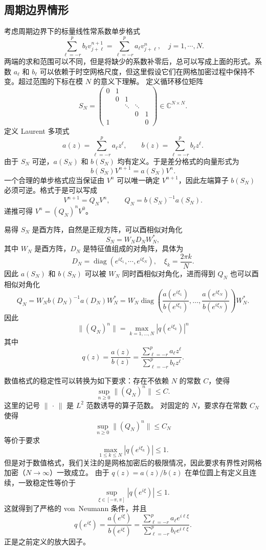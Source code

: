 \subsection*{周期边界情形}

考虑周期边界下的标量线性常系数单步格式
\[
    \sum_{\ell=-r}^{p} b_\ell v_{j+\ell}^{n+1}
    = \sum_{\ell=-r}^{p} a_\ell v_{j+\ell}^n,
    \quad j=1,\cdots,N.
\]
两端的求和范围可以不同，但是将缺少的系数补零后，总可以写成上面的形式。系数 $a_\ell$ 和 $b_\ell$ 可以依赖于时空网格尺度，但这里假设它们在网格加密过程中保持不变。超过范围的下标在模 $N$ 的意义下理解。
定义循环移位矩阵
\[
    S_N =
    \begin{pmatrix}
        0 & 1 &        &        &   \\
          & 0 & 1      &        &   \\
          &   & \ddots & \ddots &   \\
          &   &        & 0      & 1 \\
        1 &   &        &        & 0
    \end{pmatrix} \in \mathbb{C}^{N\times N}.
\]
定义 Laurent 多项式
\[
    a(z)=\sum_{\ell=-r}^{p}a_\ell z^\ell,
    \qquad
    b(z)=\sum_{\ell=-r}^{p}b_\ell z^\ell.
\]
由于 $S_N$ 可逆，$a(S_N)$ 和 $b(S_N)$ 均有定义。于是差分格式的向量形式为
\[
    b(S_N)V^{n+1}=a(S_N)V^n.
\]
一个合理的单步格式应当保证由 $V^n$ 可以唯一确定 $V^{n+1}$，因此左端算子 $b(S_N)$ 必须可逆。格式于是可以写成
\[
    V^{n+1}=Q_NV^n,
    \qquad
    Q_N=b(S_N)^{-1}a(S_N).
\]
递推可得 $V^n=(Q_N)^nV^0$。

易得 $S_N$ 是酉方阵，自然是正规方阵，可以酉相似对角化
\[
    S_N = W_N D_N W_N^*,
\]
其中 $W_N$ 是酉方阵，$D_N$ 是特征值组成的对角阵，具体为
\[
    D_N = \operatorname{diag}(e^{i\xi_1},\cdots,e^{i\xi_N}), \quad \xi_k=\frac{2\pi k}{N}.
\]
因此 $a(S_N)$ 和 $b(S_N)$ 可以被 $W_N$ 同时酉相似对角化，进而得到 $Q_N$ 也可以酉相似对角化
\[
    Q_N
    = W_N b(D_N)^{-1}a(D_N)W_N^*
    = W_N \operatorname{diag}\left(
    \frac{a(e^{i\xi_1})}{b(e^{i\xi_1})},\dots,
    \frac{a(e^{i\xi_N})}{b(e^{i\xi_N})}
    \right) W_N^*.
\]
因此
\[
    \|(Q_N)^n\| = \max_{k=1,\dots,N} |q(e^{i\xi_k})|^n
\]
其中
\[
    q(z) = \frac{a(z)}{b(z)} = \frac{\sum_{\ell=-r}^{p}a_\ell z^\ell}{\sum_{\ell=-r}^{p}b_\ell z^\ell}.
\]

数值格式的稳定性可以转换为如下要求：存在不依赖 $N$ 的常数 $C$，使得
\[
    \sup_{n\ge 0} \|(Q_N)^n\| \le C.
\]
这里的记号 $\|\,\cdot\,\|$ 是 $L^2$ 范数诱导的算子范数。
对固定的 $N$，要求存在常数 $C_N$ 使得
\[
    \sup_{n\ge 0} \|(Q_N)^n\| \le C_N
\]
等价于要求
\[
    \max_{1\le k \le N} |q(e^{i\xi_k})| \le 1.
\]
但是对于数值格式，我们关注的是网格加密后的极限情况，因此要求有界性对网格加密（$N\to\infty$）一致成立。
由于 $q(z)=a(z)/b(z)$ 在单位圆上有定义且连续，一致稳定性等价于
\[
    \sup_{\xi\in[-\pi,\pi]} |q(e^{i\xi})| \le 1.
\]
这就得到了严格的 von~Neumann 条件，并且
\[
    q(e^{i\xi}) = \frac{a(e^{i\xi})}{b(e^{i\xi})} = \frac{\sum_{\ell=-r}^{p}a_\ell e^{i\ell\xi}}{\sum_{\ell=-r}^{p}b_\ell e^{i\ell\xi}}.
\]
正是之前定义的放大因子。

